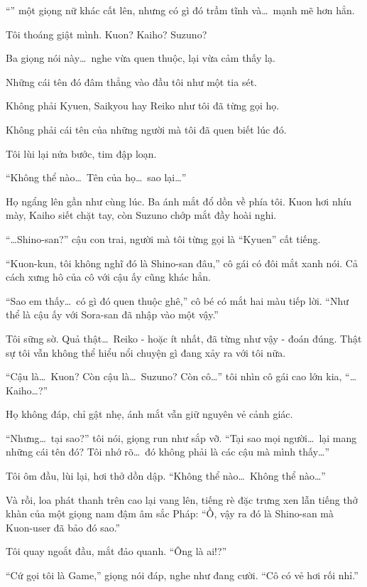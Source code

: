 \documentclass[../main.tex]{subfiles}
\begin{document}
``'' một giọng nữ khác cất lên, nhưng có gì đó trầm tĩnh và\dots\ mạnh mẽ hơn hẳn.

Tôi thoáng giật mình. Kuon? Kaiho? Suzuno?

Ba giọng nói này\dots\ nghe vừa quen thuộc, lại vừa cảm thấy lạ.

Những cái tên đó đâm thẳng vào đầu tôi như một tia sét.

Không phải Kyuen, Saikyou hay Reiko như tôi đã từng gọi họ.

Không phải cái tên của những người mà tôi đã quen biết lúc đó.

Tôi lùi lại nửa bước, tim đập loạn.

``Không thể nào\dots\ Tên của họ\dots\ sao lại\dots''

Họ ngẩng lên gần như cùng lúc. Ba ánh mắt đổ dồn về phía tôi. Kuon hơi nhíu mày, Kaiho siết chặt tay, còn Suzuno chớp mắt đầy hoài nghi.

``\dots Shino-san?'' cậu con trai, người mà tôi từng gọi là ``Kyuen'' cất tiếng.

``Kuon-kun, tôi không nghĩ đó là Shino-san đâu,'' cô gái có đôi mắt xanh nói. Cả cách xưng hô của cô với cậu ấy cũng khác hẳn.

``Sao em thấy\dots\ có gì đó quen thuộc ghê,'' cô bé có mắt hai màu tiếp lời. ``Như thể là cậu ấy với Sora-san đã nhập vào một vậy.''

Tôi sững sờ. Quả thật\dots\ Reiko - hoặc ít nhất, đã từng như vậy - đoán đúng. Thật sự tôi vẫn không thể hiểu nổi chuyện gì đang xảy ra với tôi nữa.

``Cậu là\dots\ Kuon? Còn cậu là\dots\ Suzuno? Còn cô\dots'' tôi nhìn cô gái cao lớn kia, ``\dots Kaiho\dots?''

Họ không đáp, chỉ gật nhẹ, ánh mắt vẫn giữ nguyên vẻ cảnh giác.

``Nhưng\dots\ tại sao?'' tôi nói, giọng run như sắp vỡ. ``Tại sao mọi người\dots\ lại mang những cái tên đó? Tôi nhớ rõ\dots\ đó không phải là các cậu mà mình thấy\dots''

Tôi ôm đầu, lùi lại, hơi thở dồn dập. ``Không thể nào\dots\ Không thể nào\dots''

Và rồi, loa phát thanh trên cao lại vang lên, tiếng rè đặc trưng xen lẫn tiếng thở khàn của một giọng nam đậm âm sắc Pháp: ``Ồ, vậy ra đó là Shino-san mà Kuon-user đã bảo đó sao.''

Tôi quay ngoắt đầu, mắt đảo quanh. ``Ông là ai!?''

``Cứ gọi tôi là Game,'' giọng nói đáp, nghe như đang cười. ``Cô có vẻ hơi rối nhỉ.''
\end{document}
